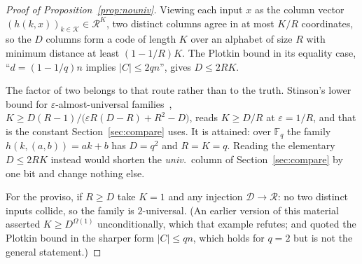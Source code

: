 \documentclass{aicr-solution}
\newcommand{\calK}{\mathcal{K}}
\newcommand{\calD}{\mathcal{D}}
\newcommand{\calR}{\mathcal{R}}
\begin{document}
\begin{proof}[Proof of Proposition~\ref{prop:nouniv}]
Viewing each input $x$ as the column vector $(h(k,x))_{k \in \calK} \in \calR^{K}$, two distinct
columns agree in at most $K/R$ coordinates, so the $D$ columns form a code of length $K$ over an
alphabet of size $R$ with minimum distance at least $(1 - 1/R)K$. The Plotkin bound in its
equality case, ``$d = (1-1/q)n$ implies $|C| \le 2qn$'', gives $D \le 2RK$.

The factor of two belongs to that route rather than to the truth. Stinson's lower bound for
$\varepsilon$-almost-universal families~\cite{Sti94},
$K \ge D(R-1)/\bigl(\varepsilon R(D-R) + R^{2} - D\bigr)$, reads $K \ge D/R$ at
$\varepsilon = 1/R$, and that is the constant Section~\ref{sec:compare} uses. It is attained: over
$\mathbb{F}_q$ the family $h(k,(a,b)) = ak+b$ has $D = q^{2}$ and $R = K = q$. Reading the
elementary $D \le 2RK$ instead would shorten the \emph{univ.}\ column of
Section~\ref{sec:compare} by one bit and change nothing else.

For the proviso, if $R \ge D$ take
$K = 1$ and any injection $\calD \to \calR$: no two distinct inputs collide, so the family is
$2$-universal. (An earlier version of this material asserted $K \ge D^{\Omega(1)}$ unconditionally,
which that example refutes; and quoted the Plotkin bound in the sharper form $|C| \le qn$, which
holds for $q = 2$ but is not the general statement.)
\end{proof}
\end{document}

